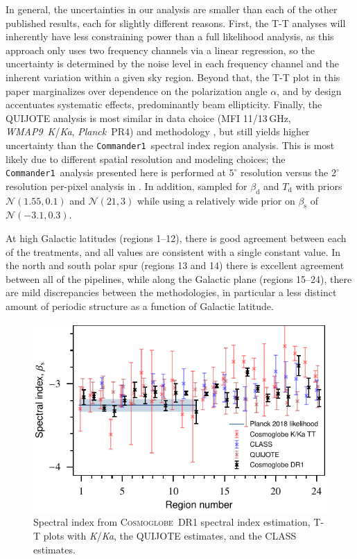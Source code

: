 \documentclass[twocolumn]{../../common/aa}
\def\WMAPnine{\emph{WMAP9}}
\def\Planck{\emph{Planck}}
\def\commanderone{\texttt{Commander1}}
\newcommand{\cosmoglobe}{\textsc{Cosmoglobe}}
\newcommand{\K}[0]{\textit K}
\newcommand{\Ka}[0]{\textit{Ka}}
\begin{document}
In general, the uncertainties in our analysis are smaller than each of the other published results, each for slightly different reasons. First, the T-T analyses will inherently have less constraining power than a full likelihood analysis, as this approach only uses two frequency channels via a linear regression, so the uncertainty is determined by the noise level in each frequency channel and the inherent variation within a given sky region. Beyond that, the T-T plot in this paper marginalizes over dependence on the polarization angle $\alpha$, and by design accentuates systematic effects, predominantly beam ellipticity. Finally, the QUIJOTE analysis is most similar in data choice (MFI 11/13\,GHz, \WMAPnine\ \K/\Ka, \Planck\ PR4) and methodology \citep[\texttt{B-SeCRET};][]{b-secret}, but still yields higher uncertainty than the \commanderone\ spectral index region analysis. This is most likely due to different spatial resolution and modeling choices; the \commanderone\ analysis presented here is performed at $5^\circ$ resolution versus the $2^\circ$ resolution per-pixel analysis in \citet{QUIJOTE_VIII}. In addition, \citet{QUIJOTE_VIII} sampled for $\beta_\mathrm d$ and $T_\mathrm{d}$ with priors $\mathcal N(1.55,0.1)$ and $\mathcal N(21,3)$ while using a relatively wide prior on $\beta_\mathrm s$ of $\mathcal N(-3.1, 0.3)$.

At high Galactic latitudes (regions 1--12), there is good agreement between each of the treatments, and all values are consistent with a single constant value. 
In the north and south polar spur (regions 13 and 14) there is excellent agreement between all of the pipelines, while along  the Galactic plane (regions 15--24), there are mild discrepancies between the methodologies, in particular a less distinct amount of periodic structure as a function of Galactic latitude.

\begin{figure}
	\centering
	\includegraphics[width=\columnwidth]{figures/compare_betas.pdf}
	\caption{Spectral index from \cosmoglobe\ DR1 spectral index estimation, T-T plots with \K/\Ka, the QUIJOTE estimates, and the CLASS estimates.
	}
	\label{fig:beta_comp}
\end{figure}
\end{document}
